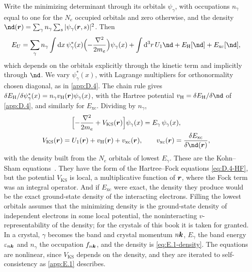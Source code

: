 Write the minimizing determinant through its orbitals $\psi_\gamma$, with occupations $n_\gamma$ equal to one for the $N_e$ occupied orbitals and zero otherwise, and the density $\nd(\vect{r}) = \sum_\gamma n_\gamma\sum_s|\psi_\gamma(\vect{r}, s)|^2$. Then
\begin{equation*}
  E_U = \sum_\gamma n_\gamma\int\dd x\,\psi^*_\gamma(x)\Bigl(-\frac{\nabla^2}{2m_e}\Bigr)\psi_\gamma(x) + \int\dd^3r\,U_1\nd + E_{\mathrm{H}}[\nd] + E_{\mathrm{xc}}[\nd] ,
\end{equation*}
which depends on the orbitals explicitly through the kinetic term and implicitly through $\nd$. We vary $\psi^*_\gamma(x)$, with Lagrange multipliers for orthonormality chosen diagonal, as in \cref{app:D.4}. The chain rule gives $\delta E_{\mathrm{H}}/\delta\psi^*_\gamma(x) = n_\gamma v_{\mathrm{H}}(\bm{r})\psi_\gamma(x)$, with the Hartree potential $v_{\mathrm{H}} = \delta E_{\mathrm{H}}/\delta\nd$ of \cref{app:D.4}, and similarly for $E_{\mathrm{xc}}$. Dividing by $n_\gamma$,
\begin{equation}
  \begin{gathered}
  \Bigl[-\frac{\nabla^2}{2m_e} + V_{\mathrm{KS}}(\vect{r})\Bigr]\psi_\gamma(x) = E_\gamma\,\psi_\gamma(x), \\
  V_{\mathrm{KS}}(\vect{r}) = U_1(\vect{r}) + v_{\mathrm{H}}(\vect{r}) + v_{\mathrm{xc}}(\vect{r}), \qquad
  v_{\mathrm{xc}}(\vect{r}) = \frac{\delta E_{\mathrm{xc}}}{\delta\nd(\vect{r})} ,
  \end{gathered}
  \label{eq:D.5-KS}
\end{equation}
with the density built from the $N_e$ orbitals of lowest $E_\gamma$. These are the Kohn--Sham equations~\cite{kohn1965self}. They have the form of the Hartree--Fock equations \cref{eq:D.4-HF}, but the potential $V_{\mathrm{KS}}$ is local, a multiplicative function of $\bm{r}$, where the Fock term was an integral operator. And if $E_{\mathrm{xc}}$ were exact, the density they produce would be the exact ground-state density of the interacting electrons. Filling the lowest orbitals assumes that the minimizing density is the ground-state density of independent electrons in some local potential, the noninteracting $v$-representability of the density; for the crystals of this book it is taken for granted. In a crystal, $\gamma$ becomes the band and crystal momentum $n\bm{k}$, $E_\gamma$ the band energy $\varepsilon_{n\bm{k}}$ and $n_\gamma$ the occupation $f_{n\bm{k}}$, and the density is \cref{eq:E.1-density}. The equations are nonlinear, since $V_{\mathrm{KS}}$ depends on the density, and they are iterated to self-consistency as \cref{app:E.1} describes.

